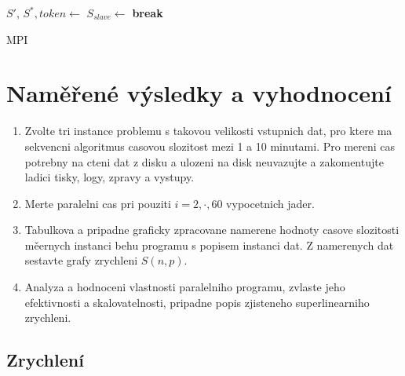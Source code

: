 \documentclass{article}
\begin{document}
\begin{algorithm}[H]
{{{{{                }\;

            \;
            }\;

            }\;

            }  {
                 {
                    \If{\MpiIProbe} {
                        $S'$, $S^*, token \leftarrow$ \MpiRecv\;
                         {
                        $S_{slave} \leftarrow$  \;
                        \;
                        }  {
                            {\bf break}\;
                        }\;

                    }\;
                }\;

            }\;
        }\;
        \caption{MPI}
        \label{alg:mpi}
    \end{algorithm}


    \section{Naměřené výsledky a vyhodnocení}

    \begin{enumerate}
        \item Zvolte tri instance problemu s takovou velikosti vstupnich dat, pro ktere ma sekvencni
        algoritmus casovou slozitost mezi 1 a 10 minutami.
        Pro mereni cas potrebny na cteni dat z disku a ulozeni na disk neuvazujte a zakomentujte
        ladici tisky, logy, zpravy a vystupy.
        \item Merte paralelni cas pri pouziti $i=2,\cdot,60$ vypocetnich jader.
        \item Tabulkova a pripadne graficky zpracovane namerene hodnoty casove slozitosti měernych instanci behu programu s popisem instanci dat. Z namerenych dat sestavte grafy zrychleni $S(n,p)$.
        \item Analyza a hodnoceni vlastnosti paralelniho programu, zvlaste jeho efektivnosti a skalovatelnosti, pripadne popis zjisteneho superlinearniho zrychleni.
    \end{enumerate}

    \subsection{Zrychlení}
\end{document}

